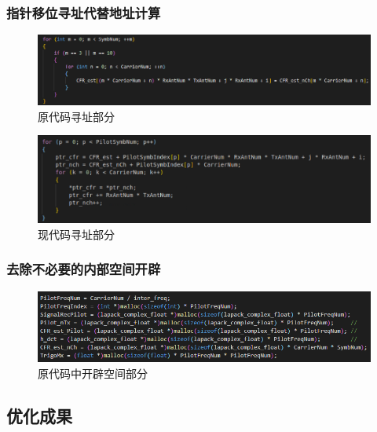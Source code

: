 \documentclass{article}
\begin{document}
\subsubsection{指针移位寻址代替地址计算}
\begin{figure}[H]
	\centering
	\includegraphics[width = .8\textwidth]{indx.png}
	\caption{原代码寻址部分}
\end{figure}
\begin{figure}[H]
	\centering
	\includegraphics[width = .8\textwidth]{ptr.png}
	\caption{现代码寻址部分}
\end{figure}
\subsubsection{去除不必要的内部空间开辟}
\begin{figure}[H]
	\centering
	\includegraphics[width = .8\textwidth]{malloc.png}
	\caption{原代码中开辟空间部分}
\end{figure}

\subsection{优化成果}
\end{document}
